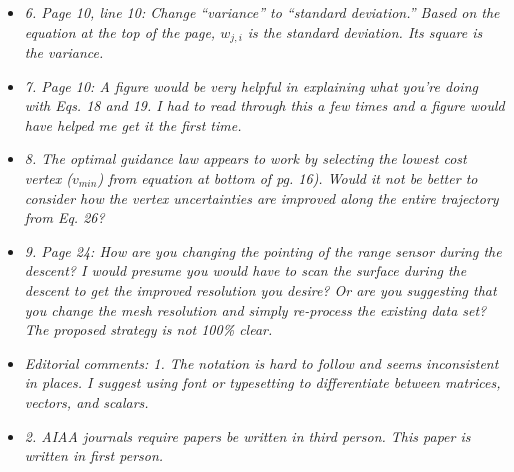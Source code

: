 \documentclass[11pt]{article}
\newcommand{\comment}[1]{\item \itshape #1 \normalfont}
\begin{document}
\begin{itemize}
\comment{6.      Page 10, line 10: Change “variance” to “standard deviation.” Based on the equation at the top of the page, $w_{j,i}$ is the standard deviation. Its square is the variance.}

\comment{7.      Page 10: A figure would be very helpful in explaining what you’re doing with Eqs. 18 and 19. I had to read through this a few times and a figure would have helped me get it the first time.}

\comment{8.      The optimal guidance law appears to work by selecting the lowest cost vertex ($v_{min}$) from equation at bottom of pg. 16). Would it not be better to consider how the vertex uncertainties are improved along the entire trajectory from Eq. 26?}

\comment{9.      Page 24: How are you changing the pointing of the range sensor during the descent? I would presume you would have to scan the surface during the descent to get the improved resolution you desire? Or are you suggesting that you change the mesh resolution and simply re-process the existing data set? The proposed strategy is not 100\% clear.}

\comment{Editorial comments:
1.      The notation is hard to follow and seems inconsistent in places. I suggest using font or typesetting to differentiate between matrices, vectors, and scalars. }

\comment{2.      AIAA journals require papers be written in third person. This paper is written in first person.}
\end{itemize}
\end{document}

